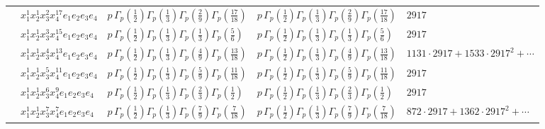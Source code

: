 \documentclass[11pt]{article}
\begin{document}
\begin{table}[ht]
{\begin{tabular}{@{}lllll@{}}
 & $x_{1}^{1} x_{2}^{1} x_{3}^{2} x_{4}^{17}  e_{1} e_{2} e_{3} e_{4}$ & $p \, \Gamma_p \left( \frac{1}{2} \right) \Gamma_p \left( \frac{1}{3} \right) \Gamma_p \left( \frac{2}{9} \right) \Gamma_p \left( \frac{17}{18} \right)$ & $p \, \Gamma_p \left( \frac{1}{2} \right) \Gamma_p \left( \frac{1}{3} \right) \Gamma_p \left( \frac{2}{9} \right) \Gamma_p \left( \frac{17}{18} \right)$ & $2917$ \\
 & $x_{1}^{1} x_{2}^{1} x_{3}^{3} x_{4}^{15}  e_{1} e_{2} e_{3} e_{4}$ & $p \, \Gamma_p \left( \frac{1}{2} \right) \Gamma_p \left( \frac{1}{3} \right) \Gamma_p \left( \frac{1}{3} \right) \Gamma_p \left( \frac{5}{6} \right)$ & $p \, \Gamma_p \left( \frac{1}{2} \right) \Gamma_p \left( \frac{1}{3} \right) \Gamma_p \left( \frac{1}{3} \right) \Gamma_p \left( \frac{5}{6} \right)$ & $2917$ \\
 & $x_{1}^{1} x_{2}^{1} x_{3}^{4} x_{4}^{13}  e_{1} e_{2} e_{3} e_{4}$ & $p \, \Gamma_p \left( \frac{1}{2} \right) \Gamma_p \left( \frac{1}{3} \right) \Gamma_p \left( \frac{4}{9} \right) \Gamma_p \left( \frac{13}{18} \right)$ & $p \, \Gamma_p \left( \frac{1}{2} \right) \Gamma_p \left( \frac{1}{3} \right) \Gamma_p \left( \frac{4}{9} \right) \Gamma_p \left( \frac{13}{18} \right)$ & $1131{\cdot}2917{+}1533{\cdot}2917^{2}{+}\cdots$ \\
 & $x_{1}^{1} x_{2}^{1} x_{3}^{5} x_{4}^{11}  e_{1} e_{2} e_{3} e_{4}$ & $p \, \Gamma_p \left( \frac{1}{2} \right) \Gamma_p \left( \frac{1}{3} \right) \Gamma_p \left( \frac{5}{9} \right) \Gamma_p \left( \frac{11}{18} \right)$ & $p \, \Gamma_p \left( \frac{1}{2} \right) \Gamma_p \left( \frac{1}{3} \right) \Gamma_p \left( \frac{5}{9} \right) \Gamma_p \left( \frac{11}{18} \right)$ & $2917$ \\
 & $x_{1}^{1} x_{2}^{1} x_{3}^{6} x_{4}^{9}  e_{1} e_{2} e_{3} e_{4}$ & $p \, \Gamma_p \left( \frac{1}{2} \right) \Gamma_p \left( \frac{1}{3} \right) \Gamma_p \left( \frac{2}{3} \right) \Gamma_p \left( \frac{1}{2} \right)$ & $p \, \Gamma_p \left( \frac{1}{2} \right) \Gamma_p \left( \frac{1}{3} \right) \Gamma_p \left( \frac{2}{3} \right) \Gamma_p \left( \frac{1}{2} \right)$ & $2917$ \\
 & $x_{1}^{1} x_{2}^{1} x_{3}^{7} x_{4}^{7}  e_{1} e_{2} e_{3} e_{4}$ & $p \, \Gamma_p \left( \frac{1}{2} \right) \Gamma_p \left( \frac{1}{3} \right) \Gamma_p \left( \frac{7}{9} \right) \Gamma_p \left( \frac{7}{18} \right)$ & $p \, \Gamma_p \left( \frac{1}{2} \right) \Gamma_p \left( \frac{1}{3} \right) \Gamma_p \left( \frac{7}{9} \right) \Gamma_p \left( \frac{7}{18} \right)$ & $872{\cdot}2917{+}1362{\cdot}2917^{2}{+}\cdots$ \\

\end{tabular}}
\end{table}
\end{document}
